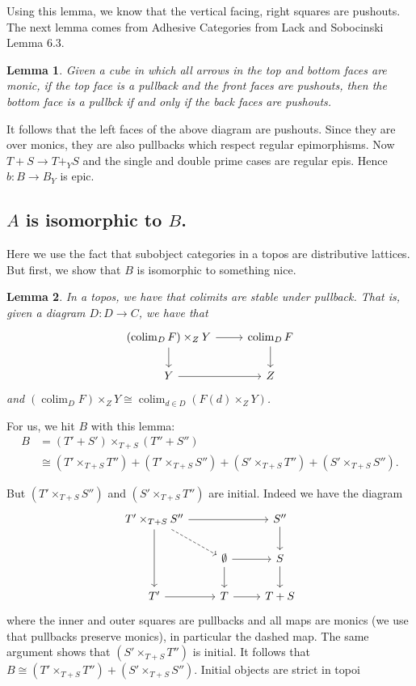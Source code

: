 \documentclass[12pt]{article}
\newcommand{\op}[1]{\operatorname{#1}}
\newcommand{\from}{\colon}
\renewcommand{\(}{\left(}
\renewcommand{\)}{\right)}
\renewcommand{\{}{\left\lbrace}
\renewcommand{\}}{\right\rbrace}
\newtheorem*{lem}{Lemma}
\theoremstyle{remark}
\theoremstyle{definition}
\begin{document}
  Using this lemma, we know that the vertical facing, right squares are pushouts.  The next 
  lemma comes from Adhesive Categories from Lack and Sobocinski Lemma 6.3.
  
  \begin{lem}
  	Given a cube in which all arrows in the top and bottom faces are monic, if the top face 
  	is a pullback and the front faces are pushouts, then the bottom face is a pullbck if 
  	and only if the back faces are pushouts.
  \end{lem}
  
  It follows that the left faces of the above diagram are pushouts.  Since they are over 
  monics, they are also pullbacks which respect regular epimorphisms. Now $T+S 
  \to T +_Y S$ 
  and the single and double prime cases are regular epis.  Hence $b \from B \to B_Y$ is 
  epic.  
  
  \subsection*{$A$ is isomorphic to $B$.}
  
  Here we use the fact that subobject categories in a topos are distributive lattices.  But 
  first, we show that $B$ is isomorphic to something nice.
  
  \begin{lem}
  In a topos, we have that colimits are stable under pullback.  That is, given a diagram $D 
  \from D \to C$, we have that
  \[
  \begin{tikzcd}
	  {(\op{colim}_D F) \times_Z Y } \ar[d] \ar[r]&
	  {\op{colim}_D F} \ar[d]\\
	  {Y} \ar[r]&
	  {Z}
  \end{tikzcd}
  \]
  and $(\op{colim}_D F) \times_Z Y \cong \op{colim}_{d \in D} (F(d) \times_Z Y)$. 
  \end{lem}
  
  For us, we hit $B$ with this lemma:
  \begin{align*}
  B & = (T'+S') \times_{T+S} (T''+S'') \\
	  & \cong (T'\times_{T+S}T'')+(T'\times_{T+S}S'') + (S'\times_{T+S}T'')+ 
	  (S'\times_{T+S}S'').
  \end{align*}
  
  But $(T'\times_{T+S}S'')$ and $(S'\times_{T+S}T'')$ are initial. Indeed we 
  have the diagram
  \[
  \begin{tikzcd}
	  {T'\times_{T+S}S''} \ar[rr] \ar[dd] \ar[dr,dashed]&
	  {} &
	  {S''} \ar[d] \\
	  {} &
	  {\emptyset} \ar[d] \ar[r] &
	  {S} \ar[d]\\
	  {T'} \ar[r] &
	  {T} \ar[r]&
	  {T+S}
  \end{tikzcd}
  \]
  where the inner and outer squares are pullbacks and all maps are monics (we 
  use that pullbacks preserve monics), in particular the dashed map.  The same 
  argument shows that $(S'\times_{T+S}T'')$ is initial.  It follows that $B 
  \cong (T'\times_{T+S}T'')+ (S'\times_{T+S}S'')$.  {\color{red} Initial objects are strict in topoi}
  
\end{document}
